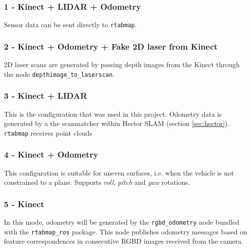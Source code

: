\subsubsection{1 - Kinect + LIDAR + Odometry} 
Sensor data can be sent directly to \texttt{rtabmap}.

\subsubsection{2 - Kinect + Odometry + Fake 2D laser from Kinect}

2D laser scans are generated by passing depth images from the Kinect through the node \texttt{depthimage\_to\_laserscan}.

\subsubsection{3 - Kinect + LIDAR}

This is the configuration that was used in this project. Odometry data is generated by a the scanmatcher within Hector SLAM (section \ref{sec:hector}). \texttt{rtabmap} receives point clouds

\subsubsection{4 - Kinect + Odometry}

This configuration is suitable for uneven surfaces, i.e. when the vehicle is not constrained to a plane. Supports \textit{roll}, \textit{pitch} and \textit{yaw} rotations.

\subsubsection{5 - Kinect}

In this mode, odometry will be generated by the \texttt{rgbd\_odometry} node bundled with the \texttt{rtabmap\_ros} package. This node publishes odometry messages based on feature correspondences in consecutive RGBD images received from the camera.


